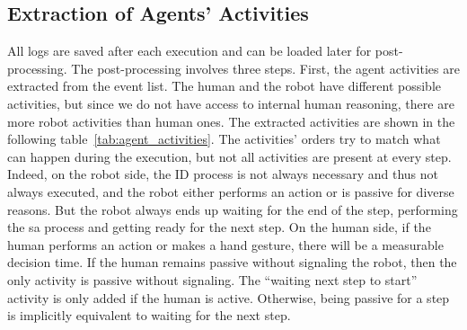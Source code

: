 \subsection{Extraction of Agents' Activities}

All logs are saved after each execution and can be loaded later for post-processing. The post-processing involves three steps. First, the agent activities are extracted from the event list. The human and the robot have different possible activities, but since we do not have access to internal human reasoning, there are more robot activities than human ones. The extracted activities are shown in the following table~\ref{tab:agent_activities}. The activities' orders try to match what can happen during the execution, but not all activities are present at every step. Indeed, on the robot side, the ID process is not always necessary and thus not always executed, and the robot either performs an action or is passive for diverse reasons. But the robot always ends up waiting for the end of the step, performing the \acrshort{sa} process and getting ready for the next step. On the human side, if the human performs an action or makes a hand gesture, there will be a measurable decision time. If the human remains passive without signaling the robot, then the only activity is passive without signaling. The ``waiting next step to start'' activity is only added if the human is active. Otherwise, being passive for a step is implicitly equivalent to waiting for the next step.  

